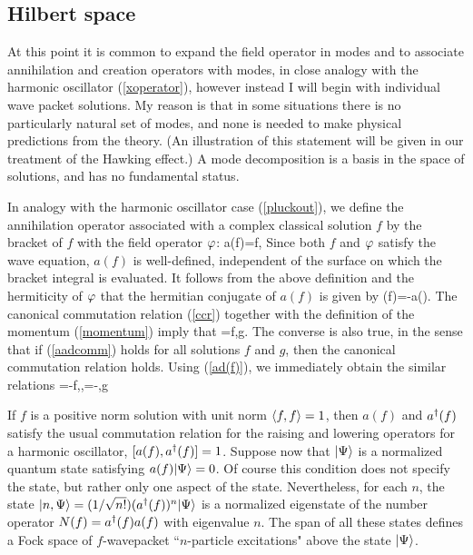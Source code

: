 \documentclass[12pt]{article}
\begin{document}
\subsection{Hilbert space}
\label{Hilbert}
At this point it is common to expand the field operator in
modes and to associate annihilation and creation operators with
modes, in close analogy with the harmonic oscillator
(\ref{xoperator}), however instead I will begin with individual
wave packet solutions. My reason is that in some situations
there is no particularly natural set of modes, and none is
needed to make physical predictions from the theory. (An
illustration of this statement will be given in our treatment of 
the Hawking effect.) A mode
decomposition is a basis in the space of solutions, and has no
fundamental status.

In analogy with the harmonic oscillator case (\ref{pluckout}),
we define the annihilation operator associated with a complex
classical solution $f$ by the bracket of $f$ with the field
operator $\varphi$:
%
\beq a(f)=\la f,\fphi\ra \label{a(f)}\eeq
%
Since both $f$ and $\varphi$ satisfy the wave equation, $a(f)$ is
well-defined, independent of the surface on which the bracket
integral is evaluated. It follows from the above definition and
the hermiticity of $\varphi$ that the hermitian conjugate of
$a(f)$ is given by
%
\beq \ad(f)=-a().\label{ad(f)}\eeq
%
The canonical commutation relation (\ref{ccr}) together with
the definition of the momentum (\ref{momentum}) imply that
%
\beq [a(f),\ad(g)]=\la f,g\ra.\label{aadcomm}\eeq
%
The converse is also true, in the sense that if (\ref{aadcomm})
holds for all solutions $f$ and $g$, then the canonical
commutation relation holds. Using (\ref{ad(f)}), we immediately
obtain the similar relations
%
\beq [a(f),a(g)]=-\la f,\ra,\qquad\qquad
[\ad(f),\ad(g)]=-\la {},g\ra \label{aacomm}\eeq
%

If $f$ is a positive norm
solution with unit norm $\langle f,f\rangle=1$, then $a(f)$ and
$a^\dagger(f)$ satisfy the usual commutation relation for the raising
and lowering operators for a harmonic oscillator,
$[a(f),a^\dagger(f)]=1$. Suppose now that $|\Psi\rangle$ is a normalized
quantum state satisfying $a(f)|\Psi\rangle=0$. Of course this
condition does not specify the state, but rather only one
aspect of the state. Nevertheless, for each $n$, the state
$|n,\Psi\rangle=(1/\sqrt{n!})(a^\dagger(f))^n|\Psi\rangle$ is a normalized
eigenstate of the number operator $N(f)=a^\dagger(f)a(f)$ with
eigenvalue $n$. The span of all these states defines a Fock
space of $f$-wavepacket ``$n$-particle excitations" above the
state $|\Psi\rangle$.
\end{document}
